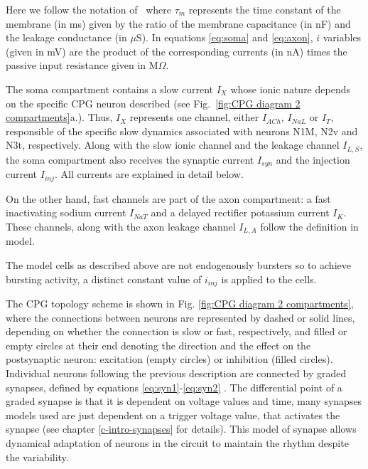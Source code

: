 \noindent Here we follow the notation of~\cite{Vavoulis2007} where $\tau_m$ represents the time constant of the membrane (in ms) given by the ratio of the membrane capacitance (in nF) and the leakage conductance (in $\mu$S).  In equations \ref{eq:soma} and \ref{eq:axon}, $i$ variables (given in mV) are the product of the corresponding currents (in nA) times the passive input resistance given in M$\Omega$.

The soma compartment contains a slow current $I_X$ whose ionic nature depends on the specific CPG neuron described (see Fig.~\ref{fig:CPG diagram 2 compartments}a.). Thus, $I_X$  represents one channel, either $I_{ACh}$, $I_{NaL}$ or $I_{T}$, responsible of the specific slow dynamics associated with neurons N1M, N2v and N3t, respectively.  Along with the slow ionic channel and the leakage channel  $I_{L,S}$, the soma compartment also receives the synaptic current $I_{syn}$ and the injection current $I_{inj}$. All currents are explained in detail below.

On the other hand, fast channels are part of the axon compartment: a fast inactivating sodium current $I_{NaT}$ and a delayed rectifier potassium current $I_{K}$. These channels, along with the axon leakage channel  $I_{L,A}$ follow the definition in \cite{HODGKIN1952} model.

The model cells as described above are not endogenously bursters so to achieve bursting activity, a distinct constant value of  \(i_{inj}\) is applied to the cells. 

The CPG topology scheme is shown in Fig. \ref{fig:CPG diagram 2 compartments}, where the connections between neurons are represented by dashed or solid lines, depending on whether the connection is slow or fast, respectively, and filled or empty circles at their end denoting the direction and the effect on the postsynaptic neuron: excitation (empty circles) or inhibition (filled circles).
Individual neurons following the previous description are connected by graded synapses, defined by equations \ref{eq:syn1}-\ref{eq:syn2} \parencite{Vavoulis2007}. The differential point of a graded synapse is that it is dependent on voltage values and time, many synapses models used are just dependent on a trigger voltage value, that activates the synapse (see chapter \ref{c-intro-synapses} for details). This model of synapse allows dynamical adaptation of neurons in the circuit to maintain the rhythm despite the variability. 

